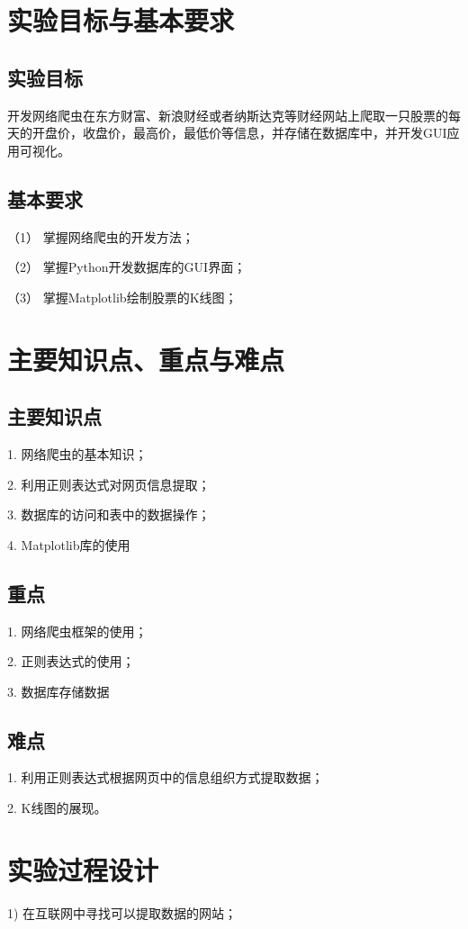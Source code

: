 \documentclass[UTF8,12pt]{article}
\begin{document}
\begin{center}
    \tableofcontents
\end{center}
\newpage

\section{实验目标与基本要求}
\subsection{实验目标}
开发网络爬虫在东方财富、新浪财经或者纳斯达克等财经网站上爬取一只股票的每天的开盘价，收盘价，最高价，最低价等信息，并存储在数据库中，并开发GUI应用可视化。

\subsection{基本要求}
（1） 掌握网络爬虫的开发方法；

（2） 掌握Python开发数据库的GUI界面；

（3） 掌握Matplotlib绘制股票的K线图；

\section{主要知识点、重点与难点}
\subsection{主要知识点}
1.	网络爬虫的基本知识；

2.	利用正则表达式对网页信息提取；

3.	数据库的访问和表中的数据操作；

4.	Matplotlib库的使用

\subsection{重点}
1.	网络爬虫框架的使用；

2.	正则表达式的使用；

3.	数据库存储数据

\subsection{难点}
1.	利用正则表达式根据网页中的信息组织方式提取数据；

2.	K线图的展现。

\section{实验过程设计}
1)	在互联网中寻找可以提取数据的网站；
\end{document}
